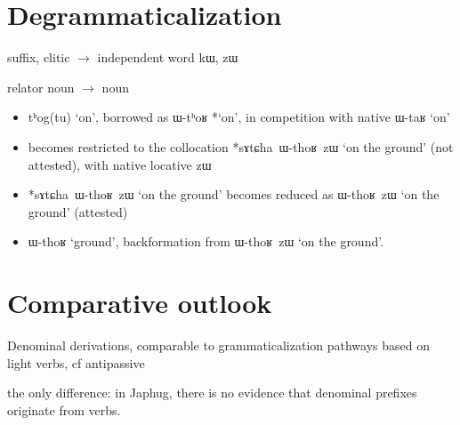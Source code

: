 \documentclass[oldfontcommands,oneside,a4paper,11pt]{article}
\newcommand{\ipa}[1]{\mbox{\phon #1}} %
\begin{document}
 \section{Degrammaticalization}
 
 suffix, clitic $\rightarrow$ independent word
\ipa{kɯ}, \ipa{zɯ}

relator noun $\rightarrow$ noun 



\begin{itemize}
\item \ipa{tʰog(tu)} `on', borrowed as \ipa{ɯ-tʰoʁ} *`on', in competition with native \ipa{ɯ-taʁ} `on'
\item becomes restricted to the collocation *\ipa{sɤtɕha ɯ-thoʁ zɯ} `on the ground' (not attested), with native locative \ipa{zɯ}
\item *\ipa{sɤtɕha ɯ-thoʁ zɯ} `on the ground' becomes reduced as \ipa{ɯ-thoʁ zɯ} `on the ground' (attested)
\item  \ipa{ɯ-thoʁ} `ground', backformation from \ipa{ɯ-thoʁ zɯ} `on the ground'.
\end{itemize}
 
 
    \section{Comparative outlook} 

Denominal derivations, comparable to grammaticalization pathways based on light verbs, cf antipassive \citealt{creissels12antip}

the only difference: in Japhug, there is no evidence that denominal prefixes originate from verbs.





\end{document}
